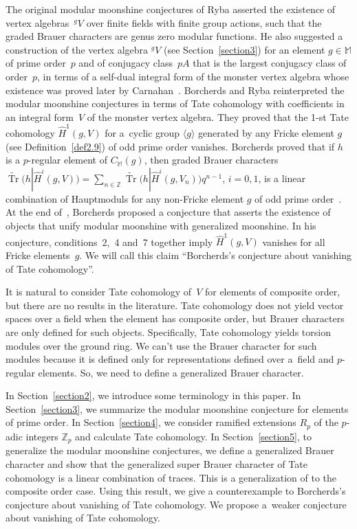 \documentclass[pdftex]{sigma}%
\numberwithin{equation}{section}
\begin{document}
The original modular moonshine conjectures of Ryba asserted the existence of vertex algebras~$^gV$ over finite fields with finite group actions, such that the graded Brauer characters are genus zero modular functions. He also suggested a construction of the vertex algebra $^{g}V$ (see Section~\ref{section3}) for an element $g \in \mathbb{M}$ of prime order~$p$ and of conjugacy class~$pA$ that is the largest conjugacy class of order~$p$, in terms of a self-dual integral form of the monster vertex algebra whose existence was proved later by Carnahan~\cite{C}.
Borcherds and Ryba reinterpreted the modular moonshine conjectures in terms of Tate cohomology with coefficients in an integral form~$V$ of the monster vertex algebra. They proved that the 1-st Tate cohomology $\hat{H}^1(g,V)$ for a~cyclic group $\langle g \rangle$ generated by any Fricke element $g$ (see Definition~\ref{def2.9}) of odd prime order vanishes. Borcherds proved that if $h$ is a $p$-regular element of $C_{\mathbb{M}}(g)$, then graded Brauer characters
$\widetilde{\operatorname{Tr}}\big(h|{\hat{H}}^i(g,V)\big)=\sum_{n \in \mathbb{Z}} \widetilde{\operatorname{Tr}}\big(h|{\hat{H}}^i(g,V_n)\big)q^{n-1}$, $i=0,1$, is a linear combination of Hauptmoduls for any non-Fricke element $g$ of odd prime order~\cite{B98,BR}. At the end of~\cite{B98}, Borcherds proposed a conjecture that asserts the existence of objects that unify modular moonshine with generalized moonshine. In his conjecture, conditions~2,~4 and~7 together imply $\hat{H}^1(g,V)$ vanishes for all Fricke elements~$g$. We will call this claim ``Borcherds's conjecture about vanishing of Tate cohomology''.

It is natural to consider Tate cohomology of~$V$ for elements of composite order, but there are no results in the literature. Tate cohomology does not yield vector spaces over a field when the element has composite order, but Brauer characters are only defined for such objects. Specifically, Tate cohomology yields torsion modules over the ground ring. We can't use the Brauer character for such modules because it is defined only for representations defined over a~field and $p$-regular elements. So, we need to define a generalized Brauer character.

In Section~\ref{section2}, we introduce some terminology in this paper. In Section~\ref{section3}, we summarize the modular moonshine conjecture for elements of prime order. In Section~\ref{section4}, we consider ramified extensions $R_p$ of the $p$-adic integers $\mathbb{Z}_p$ and calculate Tate cohomology. In Section~\ref{section5}, to generalize the modular moonshine conjectures, we define a generalized Brauer character and show that the generalized super Brauer character of Tate cohomology is a linear combination of traces. This is a generalization of \cite[Proposition~2.2]{BR} to the composite order case. Using this result, we give a counterexample to Borcherds's conjecture about vanishing of Tate cohomology. We propose a~weaker conjecture about vanishing of Tate cohomology.
\end{document}
